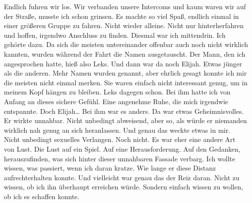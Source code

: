 Endlich fuhren wir los.
Wir verbanden unsere Intercoms und kaum waren wir auf der Straße, musste ich schon grinsen.
Es machte so viel Spaß, endlich einmal in einer größeren Gruppe zu fahren. Nicht wieder alleine. Nicht nur hinterherfahren und hoffen, irgendwo Anschluss zu finden.
Diesmal war ich mittendrin.
Ich gehörte dazu.
Da sich die meisten untereinander offenbar auch noch nicht wirklich kannten, wurden während der Fahrt die Namen ausgetauscht.
Der Mann, den ich angesprochen hatte, hieß also Leks.
Und dann war da noch Elijah.
Etwas jünger als die anderen.
Mehr Namen wurden genannt, aber ehrlich gesagt konnte ich mir die meisten nicht einmal merken. Sie waren einfach nicht interessant genug, um in meinem Kopf hängen zu bleiben.
Leks dagegen schon.
Bei ihm hatte ich von Anfang an dieses sichere Gefühl. Eine angenehme Ruhe, die mich irgendwie entspannte.
Doch Elijah…
Bei ihm war es anders.
Da war etwas Geheimnisvolles.
Er wirkte unnahbar. Nicht unbedingt abweisend, aber so, als würde er niemanden wirklich nah genug an sich heranlassen.
Und genau das weckte etwas in mir.
Nicht unbedingt sexuelles Verlangen.
Noch nicht.
Es war eher eine andere Art von Lust.
Die Lust auf ein Spiel.
Auf eine Herausforderung.
Auf den Gedanken, herauszufinden, was sich hinter dieser unnahbaren Fassade verbarg.
Ich wollte wissen, was passiert, wenn ich daran kratze.
Wie lange er diese Distanz aufrechterhalten konnte.
Und vielleicht war genau das der Reiz daran.
Nicht zu wissen, ob ich ihn überhaupt erreichen würde. Sondern einfach wissen zu wollen, ob ich es schaffen konnte.

